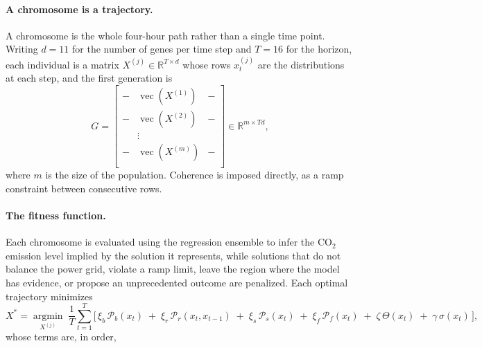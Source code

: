\documentclass[11pt]{article}
\begin{document}
\paragraph{A chromosome is a trajectory.}
A chromosome is the whole four-hour path rather than a single time point.
Writing $d = 11$ for the number of genes per time step and $T = 16$ for
the horizon, each individual is a matrix
$X^{(j)} \in \mathbb{R}^{T \times d}$ whose rows $x^{(j)}_t$ are the
distributions at each step, and the first generation is
\begin{equation}
G =
\begin{bmatrix}
- & \operatorname{vec}(X^{(1)}) & - \\
- & \operatorname{vec}(X^{(2)}) & - \\
  & \vdots &   \\
- & \operatorname{vec}(X^{(m)}) & - \\
\end{bmatrix} \in \mathbb{R}^{m \times Td},
\end{equation}
where $m$ is the size of the population. Coherence is imposed directly, as
a ramp constraint between consecutive rows.

\paragraph{The fitness function.}
Each chromosome is evaluated using the regression ensemble to infer the
CO$_2$ emission level implied by the solution it represents, while
solutions that do not balance the power grid, violate a ramp limit, leave
the region where the model has evidence, or propose an unprecedented
outcome are penalized. Each optimal trajectory minimizes
\begin{equation}
X^{*} = \underset{X^{(j)}}{\operatorname{argmin}} \;
\frac{1}{T}\sum_{t=1}^{T}
\Big[\,
\xi_b\, \mathcal{P}_b(x_t) \;+\;
\xi_r\, \mathcal{P}_r(x_t, x_{t-1}) \;+\;
\xi_s\, \mathcal{P}_s(x_t) \;+\;
\xi_f\, \mathcal{P}_f(x_t) \;+\;
\zeta\, \Theta(x_t) \;+\;
\gamma\, \sigma(x_t)
\,\Big],
\label{eq:fitness}
\end{equation}
whose terms are, in order,
\end{document}
